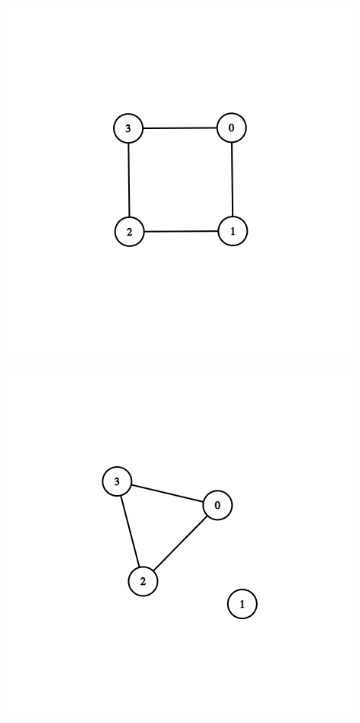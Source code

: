 \documentclass[12pt, a4paper, hidelinks]{article}
\begin{document}
\begin{figure}[H]
    \centering
    \begin{subfigure}[b]{0.45\textwidth}
        \includegraphics[width=\textwidth]{graph_v4_5.png}
    \end{subfigure}
    \begin{subfigure}[b]{0.45\textwidth}
        \includegraphics[width=\textwidth]{graph_v4_6.png}
    \end{subfigure}
\end{figure}
\end{document}
